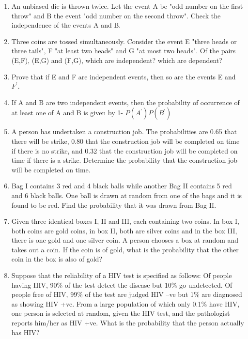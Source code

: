 \begin{enumerate}[label=\arabic*.,ref=\thesubsection.\theenumi]
\item An unbiased die is thrown twice. Let the event A be "odd number on the first throw" and B the event "odd number on the second throw". Check the independence of the events A and B.\\

\item Three coins are tossed simultaneously. Consider the event E "three heads or three tails", F "at least two heads" and G "at most two heads". Of the pairs (E,F), (E,G) and (F,G), which are independent? which are dependent?\\

\item Prove that if E and F are independent events, then so are the events E and $F^{'}$.\\

\item If A and B are two independent events, then the probability of occurrence of at least one of A and B is given by 1- $P(A^{'}) P(B^{'})$\\

\item A person has undertaken a construction job. The probabilities are 0.65 that there will be strike, 0.80 that the construction job will be completed on time if there is no strike, and 0.32 that the construction job will be completed on time if there is a strike. Determine the probability that the construction job will be completed on time.\\

\item Bag I contains 3 red and 4 black balls while another Bag II contains 5 red and 6 black balls. One ball is drawn at random from one of the bags and it is found to be red. Find the probability that it was drawn from Bag II.\\

\item Given three identical boxes I, II and III, each containing two coins. In box I, both coins are gold coins, in box II, both are silver coins and in the box III, there is one gold and one silver coin. A person chooses a box at random and takes out a coin. If the coin is of gold, what is the probability that the other coin in the box is also of gold?\\

\item Suppose that the reliability of a HIV test is specified as follows: Of people having HIV, 90$\%$ of the test detect the disease but 10$\%$ go undetected. Of people free of HIV, 99$\%$ of the test are judged HIV –ve but 1$\%$ are diagnosed as showing HIV +ve. From a large population of which only 0.1$\%$ have HIV, one person is selected at random, given the HIV test, and the pathologist reports him/her as HIV +ve. What is the probability that the person actually has HIV?\\


\end{enumerate}
